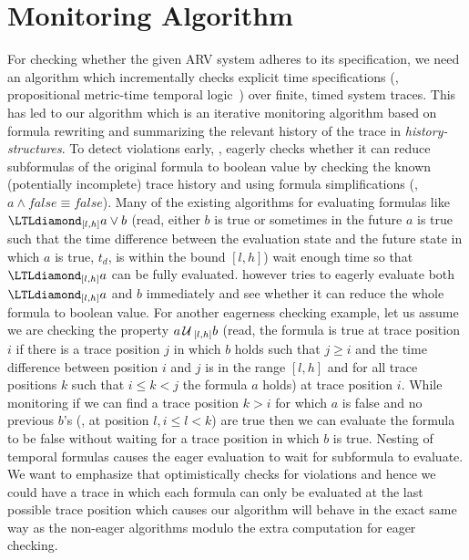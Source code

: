 
\section{Monitoring Algorithm}

For checking whether the given ARV system  adheres to its specification,
we need an algorithm which %
incrementally checks explicit time specifications (\ie, propositional metric-time temporal logic~\cite{Koymans1990})
over finite, timed system traces.
This has led to our algorithm \monitor which is an iterative monitoring algorithm based on formula rewriting and summarizing the relevant history of the trace
in \emph{history-structures}. 
To detect violations early, \monitor, eagerly checks whether it can reduce subformulas of the original formula to boolean value
by checking the known (potentially incomplete) trace history and using formula simplifications (\eg, $a\wedge \mathit{false} \equiv \mathit{false}$).
Many of the existing algorithms for evaluating formulas like $\eventually_{[l,h]} a \vee b$ (read, either $b$ is true or sometimes in the future $a$ is true such that the time difference between the evaluation state and the future state in which $a$ is true, $t_d$, is within the bound $[l,h]$) wait enough time so that $\eventually_{[l,h]} a$ can be fully evaluated.
\monitor however tries to eagerly evaluate both $\eventually_{[l,h]} a$ and $b$ immediately and see whether it can reduce the whole formula to boolean value.
For another eagerness checking example,
let us assume we are checking the property $a\,\mathrm{\cal U}\,_{[l, h]}b$ (read, the formula is true at trace position $i$ if there is a trace position
$j$ in which $b$ holds such that $j\geq i$ and the time difference between position $i$ and $j$ is in the range $[l,h]$
and for all trace positions $k$ such that $i\leq k < j$ the formula $a$ holds) at trace position $i$.
While monitoring if we can find a trace position $k > i$ for which $a$ is false and no previous $b$'s (\eg, at position $l, i \leq l < k$) are true then we can evaluate the formula to be false without waiting for a trace position in which $b$ is true. 
Nesting of temporal formulas causes the eager evaluation to wait for subformula to evaluate.
We want to emphasize that \monitor optimistically checks for violations and hence we could have a trace in which each formula can only be evaluated at the last possible trace position which causes our algorithm will behave in the exact same way as the non-eager algorithms modulo the extra computation for eager checking.
%

